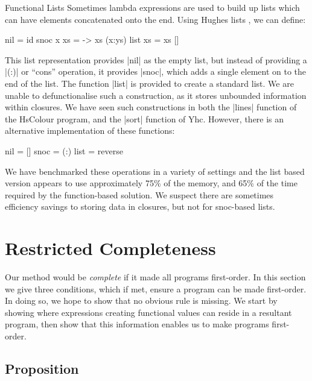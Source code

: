 \documentclass[preprint]{sigplanconf}
\begin{document}
\begin{examplename}{Functional Lists}
\label{ex:functional_lists}
Sometimes lambda expressions are used to build up lists which can have elements concatenated onto the end. Using Hughes lists \cite{hughes:lists}, we can define:

\begin{code}
nil = id
snoc x xs = \ys -> xs (x:ys)
list xs = xs []
\end{code}

This list representation provides |nil| as the empty list, but instead of providing a |(:)| or ``cons'' operation, it provides |snoc|, which adds a single element on to the end of the list. The function |list| is provided to create a standard list. We are unable to defunctionalise such a construction, as it stores unbounded information within closures. We have seen such constructions in both the |lines| function of the HsColour program, and the |sort| function of Yhc. However, there is an alternative implementation of these functions:

\begin{code}
nil = []
snoc = (:)
list = reverse
\end{code}

We have benchmarked these operations in a variety of settings and the list based version appears to use approximately 75\% of the memory, and 65\% of the time required by the function-based solution. We suspect there are sometimes efficiency savings to storing data in closures, but not for snoc-based lists.
\end{examplename}


\section{Restricted Completeness}
\label{sec:completeness}

Our method would be \textit{complete} if it made all programs first-order. In this section we give three conditions, which if met, ensure a program can be made first-order. In doing so, we hope to show that no obvious rule is missing. We start by showing where expressions creating functional values can reside in a resultant program, then show that this information enables us to make programs first-order.

\subsection{Proposition}
\end{document}
